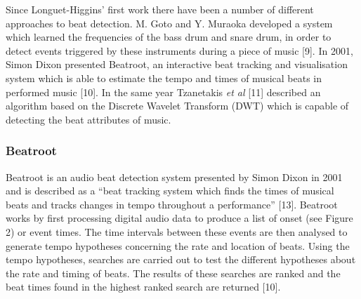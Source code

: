 \documentclass[a4paper, 11pt]{article}
\begin{document}
Since Longuet-Higgins' first work there have been a number of different approaches to beat detection. M. Goto and Y. Muraoka developed a system which learned the frequencies of the bass drum and snare drum, in order to detect events triggered by these instruments during a piece of music [9]. In 2001, Simon Dixon presented Beatroot, an interactive beat tracking and visualisation system which is able to estimate the tempo and times of musical beats in performed music [10]. In the same year Tzanetakis \textit{et al} [11] described an algorithm based on the Discrete Wavelet Transform (DWT) which is capable of detecting the beat attributes of music. 





\subsubsection{Beatroot}
Beatroot is an audio beat detection system presented by Simon Dixon in 2001 and is described as a ``beat tracking system which finds the times of musical beats and tracks changes in tempo throughout a performance'' [13]. Beatroot works by first processing digital audio data to produce a list of onset (see Figure 2) or event times. The time intervals between these events are then analysed to generate tempo hypotheses concerning the rate and location of beats. Using the tempo hypotheses, searches are carried out to test the different hypotheses about the rate and timing of beats. The results of these searches are ranked and the beat times found in the highest ranked search are returned [10]. 
\end{document}
